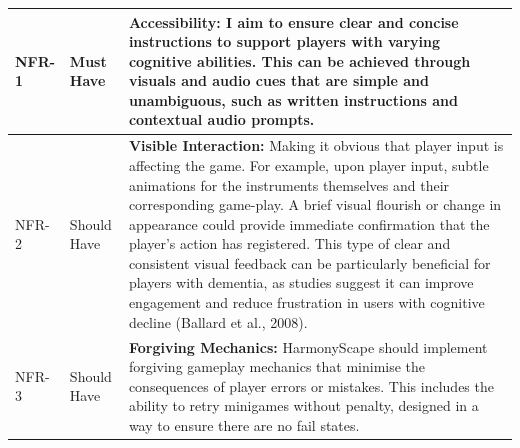 \documentclass{l4proj}
\begin{document}
\begin{longtable}{|p{1.5cm}|p{1.5cm}|p{10cm}|}
NFR-1 & Must Have & \textbf{Accessibility:} I aim to ensure clear and concise instructions to support players with varying cognitive abilities. This can be achieved through visuals and audio cues that are simple and unambiguous, such as written instructions and contextual audio prompts. \\ 
\hline
NFR-2 & Should Have & \textbf{Visible Interaction:} Making it obvious that player input is affecting the game. For example, upon player input, subtle animations for the instruments themselves and their corresponding game-play. A brief visual flourish or change in appearance could provide immediate confirmation that the player's action has registered. This type of clear and consistent visual feedback can be particularly beneficial for players with dementia, as studies suggest it can improve engagement and reduce frustration in users with cognitive decline (Ballard et al., 2008). \\ 
\hline
NFR-3 & Should Have & \textbf{Forgiving Mechanics:} HarmonyScape should implement forgiving gameplay mechanics that minimise the consequences of player errors or mistakes. This includes the ability to retry minigames without penalty, designed in a way to ensure there are no fail states. \\
\end{longtable}
\end{document}
